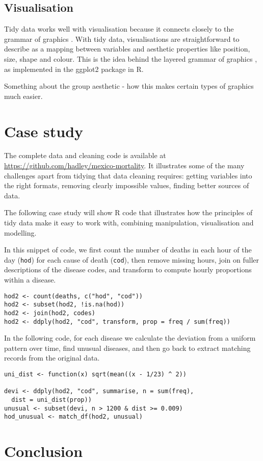 \documentclass[oneside]{article}
\begin{document}
\subsection{Visualisation}

Tidy data works well with visualisation because it connects closely to the grammar of graphics \citep{wilkinson:2006}. With tidy data, visualisations are straightforward to describe as a mapping between variables and aesthetic properties like position, size, shape and colour. This is the idea behind the layered grammar of graphics \citep{wickham:2007d}, as implemented in the ggplot2 package in R.

Something about the group aesthetic - how this makes certain types of graphics much easier.

\section{Case study} 

The complete data and cleaning code is available at \url{https://github.com/hadley/mexico-mortality}.  It illustrates some of the many challenges apart from tidying that data cleaning requires: getting variables into the right formats, removing clearly impossible values, finding better sources of data. 

The following case study will show R code that illustrates how the principles of tidy data make it easy to work with, combining manipulation, visualisation and modelling.

In this snippet of code, we first count the number of deaths in each hour of the day ({\tt hod}) for each cause of death ({\tt cod}), then remove missing hours, join on fuller descriptions of the disease codes, and transform to compute hourly proportions within a disease.

\begin{verbatim}
hod2 <- count(deaths, c("hod", "cod"))
hod2 <- subset(hod2, !is.na(hod))
hod2 <- join(hod2, codes)
hod2 <- ddply(hod2, "cod", transform, prop = freq / sum(freq))
\end{verbatim}

In the following code, for each disease we calculate the deviation from a uniform pattern over time, find unusual diseases, and then go back to extract matching records from the original data.

\begin{verbatim}
uni_dist <- function(x) sqrt(mean((x - 1/23) ^ 2))

devi <- ddply(hod2, "cod", summarise, n = sum(freq), 
  dist = uni_dist(prop))
unusual <- subset(devi, n > 1200 & dist >= 0.009)
hod_unusual <- match_df(hod2, unusual)
\end{verbatim}

\section{Conclusion}


\end{document}
